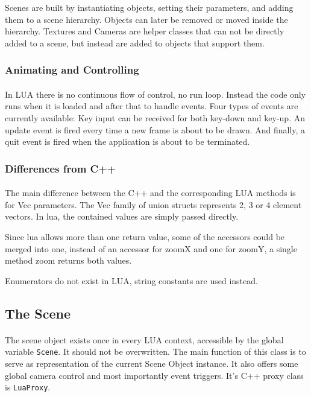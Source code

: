 Scenes are built by instantiating objects, setting their parameters, and adding them to a scene hierarchy.
Objects can later be removed or moved inside the hierarchy.
Textures and Cameras are helper classes that can not be directly added to a scene,
but instead are added to objects that support them.

\subsubsection{Animating and Controlling}
\paragraph{}
In LUA there is no continuous flow of control, no run loop. Instead the code only runs when it is loaded and after that to handle events.
Four types of events are currently available: Key input can be received for both key-down and key-up. An update event is fired every time a new frame is about to be drawn. And finally, a quit event is fired when the application is about to be terminated.

\subsubsection{Differences from C++}
\paragraph{}
The main difference between the C++ and the corresponding LUA methods is for Vec parameters. The Vec family of union structs represents 2, 3 or 4 element vectors. In lua, the contained values are simply passed directly.

Since lua allows more than one return value, some of the accessors could be merged into one, instead of an accessor for zoomX and one for zoomY, a single method zoom returns both values.

Enumerators do not exist in LUA, string constants are used instead.

\subsection{The Scene}
\paragraph{}
The scene object exists once in every LUA context, accessible by the global variable \texttt{Scene}. It should not be overwritten.
The main function of this class is to serve as representation of the current Scene Object instance.
It also offers some global camera control and most importantly event triggers.
It's C++ proxy class is \texttt{LuaProxy}.

